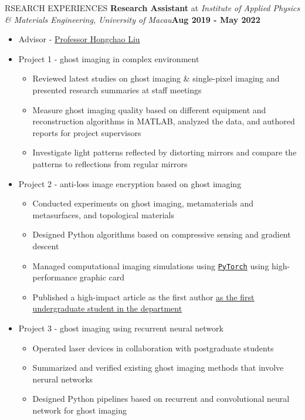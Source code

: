 \documentclass[10pt]{article} %
\begin{document}
\begin{section}{RSEARCH EXPERIENCES}
\textbf{Research Assistant} at \textit{Institute of Applied Physics \& Materials Engineering, University of Macau}\hfill \textbf{Aug 2019 - May 2022} 
\begin{itemize}[leftmargin=1.5em]
    \item Advisor - \href{mailto:hcliu@um.edu.mo}{Professor Hongchao Liu}
    \item Project 1 - ghost imaging in complex environment %
    \begin{itemize}[leftmargin=1.5em]
        \item Reviewed latest studies on ghost imaging \& single-pixel imaging and presented research summaries at staff meetings
        \item Measure ghost imaging quality based on different equipment and reconstruction algorithms in MATLAB, analyzed the data, and authored reports for project supervisors
        \item Investigate light patterns reflected by distorting mirrors and compare the patterns to reflections from regular mirrors
    \end{itemize}
    \item Project 2 - anti-loss image encryption based on ghost imaging %
    \begin{itemize}[leftmargin=1.5em]
        \item Conducted experiments on ghost imaging, metamaterials and metasurfaces, and topological materials
        \item Designed Python algorithms based on compressive sensing and gradient descent
        \item Managed computational imaging simulations using \href{https://pytorch.org/}{\texttt{PyTorch}} using high-performance graphic card
        \item Published a high-impact article as the first author \href{https://www.tdm.com.mo/en/news-detail/683438?isvideo=false&lang=en&category=all}{as the first undergraduate student in the department} 
    \end{itemize}
    \item Project 3 - ghost imaging using recurrent neural network %
    \begin{itemize}[leftmargin=1.5em]
        \item Operated laser devices in collaboration with postgraduate students
        \item Summarized and verified existing ghost imaging methods that involve nerural networks
        \item Designed Python pipelines based on recurrent and convolutional neural network for ghost imaging 
    \end{itemize}
\end{itemize}

\end{section}
\end{document}
